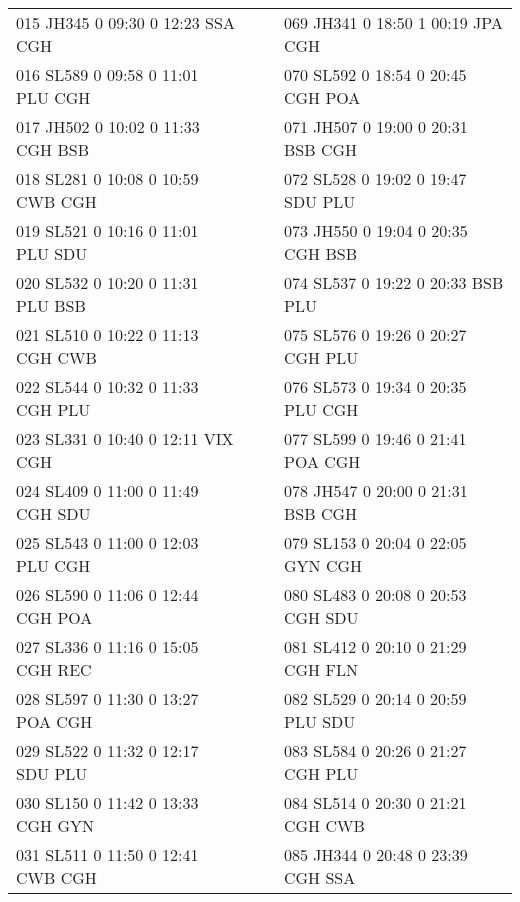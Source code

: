 \begin{scriptsize}
\begin{longtable}{l c c l}
015 JH345  0 09:30 0 12:23 SSA CGH & & & 069 JH341  0 18:50 1 00:19 JPA CGH \\

016 SL589  0 09:58 0 11:01 PLU CGH & & & 070 SL592  0 18:54 0 20:45 CGH POA \\

017 JH502  0 10:02 0 11:33 CGH BSB & & & 071 JH507  0 19:00 0 20:31 BSB CGH \\

018 SL281  0 10:08 0 10:59 CWB CGH & & & 072 SL528  0 19:02 0 19:47 SDU PLU \\

019 SL521  0 10:16 0 11:01 PLU SDU & & & 073 JH550  0 19:04 0 20:35 CGH BSB \\

020 SL532  0 10:20 0 11:31 PLU BSB & & & 074 SL537  0 19:22 0 20:33 BSB PLU \\

021 SL510  0 10:22 0 11:13 CGH CWB & & & 075 SL576  0 19:26 0 20:27 CGH PLU \\

022 SL544  0 10:32 0 11:33 CGH PLU & & & 076 SL573  0 19:34 0 20:35 PLU CGH \\

023 SL331  0 10:40 0 12:11 VIX CGH & & & 077 SL599  0 19:46 0 21:41 POA CGH \\

024 SL409  0 11:00 0 11:49 CGH SDU & & & 078 JH547  0 20:00 0 21:31 BSB CGH \\

025 SL543  0 11:00 0 12:03 PLU CGH & & & 079 SL153  0 20:04 0 22:05 GYN CGH \\

026 SL590  0 11:06 0 12:44 CGH POA & & & 080 SL483  0 20:08 0 20:53 CGH SDU \\

027 SL336  0 11:16 0 15:05 CGH REC & & & 081 SL412  0 20:10 0 21:29 CGH FLN \\

028 SL597  0 11:30 0 13:27 POA CGH & & & 082 SL529  0 20:14 0 20:59 PLU SDU \\

029 SL522  0 11:32 0 12:17 SDU PLU & & & 083 SL584  0 20:26 0 21:27 CGH PLU \\

030 SL150  0 11:42 0 13:33 CGH GYN & & & 084 SL514  0 20:30 0 21:21 CGH CWB \\

031 SL511  0 11:50 0 12:41 CWB CGH & & & 085 JH344  0 20:48 0 23:39 CGH SSA \\


\end{longtable}
\end{scriptsize}
